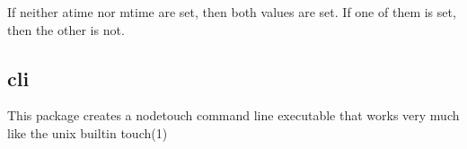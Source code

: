 If neither {\ttfamily atime} nor {\ttfamily mtime} are set, then both values are set. If one of them is set, then the other is not.

\subsection*{cli}

This package creates a {\ttfamily nodetouch} command line executable that works very much like the unix builtin {\ttfamily touch(1)} 